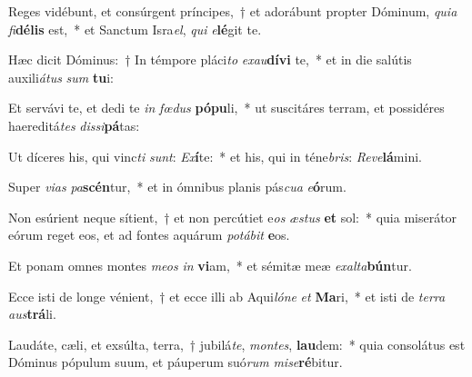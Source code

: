 \item Reges vidébunt, et consúrgent príncipes,~† et adorábunt propter Dóminum, \textit{qui}\textit{a} \textit{fi}\textbf{dé}\textbf{lis} est,~* et Sanctum Isra\textit{el}, \textit{qui} \textit{e}\textbf{lé}git te.
\item Hæc dicit Dóminus:~† In témpore pláci\textit{to} \textit{ex}\textit{au}\textbf{dí}\textbf{vi} te,~* et in die salútis auxili\textit{á}\textit{tus} \textit{sum} \textbf{tu}i:
\item Et servávi te, et dedi te \textit{in} \textit{fœ}\textit{dus} \textbf{pó}\textbf{pu}li,~* ut suscitáres terram, et possidéres haereditá\textit{tes} \textit{dis}\textit{si}\textbf{pá}tas:
\item Ut díceres his, qui vinc\textit{ti} \textit{sunt}: \textit{Ex}\textbf{í}te:~* et his, qui in téne\textit{bris}: \textit{Re}\textit{ve}\textbf{lá}mini.
\item Super \textit{vi}\textit{as} \textit{pa}\textbf{scén}tur,~* et in ómnibus planis pás\textit{cu}\textit{a} \textit{e}\textbf{ó}rum.
\item Non esúrient neque sítient,~† et non percútiet e\textit{os} \textit{æs}\textit{tus} \textbf{et} sol:~* quia miserátor eórum reget eos, et ad fontes aquárum \textit{po}\textit{tá}\textit{bit} \textbf{e}os.
\item Et ponam omnes montes \textit{me}\textit{os} \textit{in} \textbf{vi}am,~* et sémitæ meæ \textit{ex}\textit{al}\textit{ta}\textbf{bún}tur.
\item Ecce isti de longe vénient,~† et ecce illi ab Aqui\textit{ló}\textit{ne} \textit{et} \textbf{Ma}ri,~* et isti de \textit{ter}\textit{ra} \textit{aus}\textbf{trá}li.
\item Laudáte, cæli, et exsúlta, terra,~† jubilá\textit{te}, \textit{mon}\textit{tes}, \textbf{lau}dem:~* quia consolátus est Dóminus pópulum suum, et páuperum suó\textit{rum} \textit{mi}\textit{se}\textbf{ré}bitur.
